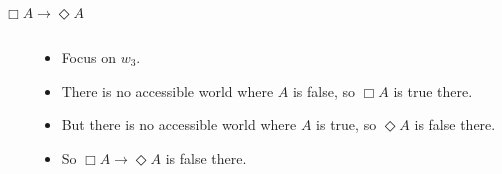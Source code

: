 \documentclass[
  ignorenonframetext,
]{beamer}
\renewcommand{\,}{\text{, }}
\begin{document}
\begin{frame}{\(\Box A \rightarrow \Diamond A\)}
\protect\hypertarget{box-a-rightarrow-diamond-a}{}

\begin{columns}
    \begin{column}{0.45\textwidth}
    \end{column}
    \begin{column}{0.5\textwidth}
    \begin{itemize}
    \item Focus on $w_3$.
    \item There is no accessible world where $A$ is false, so $\Box A$ is true there.
    \item But there is no accessible world where $A$ is true, so $\Diamond A$ is false there.
    \item So $\Box A \rightarrow \Diamond A$ is false there.
    \end{itemize}
\end{column}
\end{columns}

\end{frame}
\end{document}
